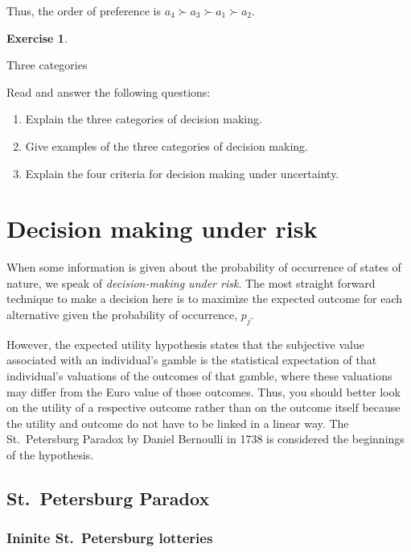 \documentclass[
  12pt,
  oneside]{book}
\providecommand{\tightlist}{%
  \setlength{\itemsep}{0pt}\setlength{\parskip}{0pt}}
\theoremstyle{definition}
\theoremstyle{definition}
\theoremstyle{definition}
\newtheorem{exercise}{Exercise}[chapter]
\theoremstyle{definition}
\theoremstyle{remark}
\begin{document}
Thus, the order of preference is \(a_4\succ a_3 \succ a_1 \succ a_2\).

\begin{exercise}
\protect\hypertarget{exr:finne}{}\label{exr:finne}

Three categories

Read \citet{Finne1998three} and answer the following questions:

\begin{enumerate}
\def\labelenumi{\alph{enumi})}
\tightlist
\item
  Explain the three categories of decision making.
\item
  Give examples of the three categories of decision making.
\item
  Explain the four criteria for decision making under uncertainty.
\end{enumerate}

\end{exercise}

\hypertarget{decision-making-under-risk}{%
\section{Decision making under risk}\label{decision-making-under-risk}}

When some information is given about the probability of occurrence of states of nature, we speak of \emph{decision-making under risk}. The most straight forward technique to make a decision here is to maximize the expected outcome for each alternative given the probability of occurrence, \(p_j\).

However, the expected utility hypothesis states that the subjective value associated with an individual's gamble is the statistical expectation of that individual's valuations of the outcomes of that gamble, where these valuations may differ from the Euro value of those outcomes. Thus, you should better look on the utility of a respective outcome rather than on the outcome itself because the utility and outcome do not have to be linked in a linear way. The St.~Petersburg Paradox by Daniel Bernoulli in 1738 is considered the beginnings of the hypothesis.

\hypertarget{st.-petersburg-paradox}{%
\subsection{St.~Petersburg Paradox}\label{st.-petersburg-paradox}}

\hypertarget{ininite-st.-petersburg-lotteries}{%
\subsubsection{Ininite St.~Petersburg lotteries}\label{ininite-st.-petersburg-lotteries}}
\end{document}
